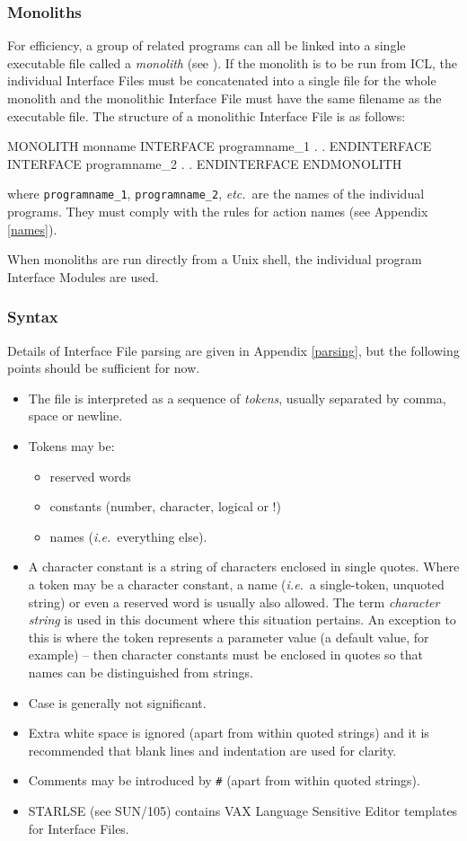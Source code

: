 \documentclass[twoside,11pt,nolof]{starlink}
\begin{document}
\subsubsection{Monoliths}
For efficiency, a group of related programs can all be
linked into a single executable file called a \emph{monolith} (see
).
If the monolith is to be run from ICL, the individual Interface Files must
be concatenated into a single file for the whole monolith and the monolithic
Interface File must have the same filename as the executable file.
The structure of a monolithic Interface File is as follows:
\begin{terminalv}
MONOLITH monname
   INTERFACE programname_1
      .
      .
   ENDINTERFACE
   INTERFACE programname_2
      .
      .
   ENDINTERFACE
ENDMONOLITH
\end{terminalv}
where \texttt{programname\_1}, \texttt{programname\_2}, \emph{etc.}\ are the names of
the individual programs. They must comply with the rules for action names
(see Appendix \ref{names}).

When monoliths are run directly from a Unix shell, the individual program
Interface Modules are used.

\subsubsection{Syntax}
Details of Interface File parsing are given in Appendix \ref{parsing}, but the
following points should be sufficient for now.
\begin{itemize}
\item The file is interpreted as a sequence of \emph{tokens}, usually separated
by comma, space or newline.
\item Tokens may be:
\begin{itemize}
\item reserved words
\item constants (number, character, logical or !)
\item names (\emph{i.e.}\ everything else).
\end {itemize}
\item A character constant is a string of characters enclosed in single quotes.
Where a token may be a character constant, a name (\emph{i.e.}\ a
single-token, unquoted string) or even a reserved word is usually also allowed.
The term \emph{character string} is used in this document where this situation
pertains.
An exception to this is where the token represents a parameter value (a
default value, for example) -- then character constants must be enclosed in
quotes so that names can be distinguished from strings.
\item Case is generally not significant.
\item Extra white space is ignored (apart from within quoted
strings) and it is recommended that blank lines and indentation are used for
clarity.
\item Comments may be introduced by \texttt{\#} (apart from within
quoted strings).
\item STARLSE (see SUN/105) contains VAX Language Sensitive Editor templates
for Interface Files.
\end{itemize}
\end{document}
